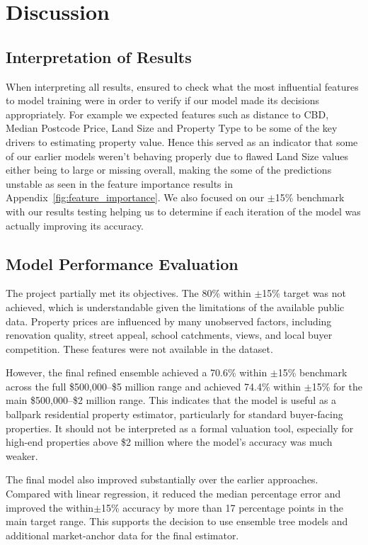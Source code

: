 \documentclass[a4paper,12pt]{article}
\begin{document}
\section{Discussion}

\subsection{Interpretation of Results}
When interpreting all results, ensured to check what the most influential features to model training were in order to verify if our model made its decisions appropriately. For example we expected features such as distance to CBD, Median Postcode Price, Land Size and Property Type to be some of the key drivers to estimating property value. Hence this served as an indicator that some of our earlier
models weren't behaving properly due to flawed Land Size values either being to large or missing overall, making the some of the predictions unstable as seen in the feature importance results in Appendix~\ref{fig:feature_importance}. We also focused on our $\pm$15\% benchmark with our results testing helping us to determine if each iteration of the model was actually improving its accuracy.

\subsection{Model Performance Evaluation}

The project partially met its objectives. The 80\% within $\pm$15\% target was not achieved, which is understandable given the limitations of the available public data. Property prices are influenced by many unobserved factors, including renovation quality, street appeal, school catchments, views, and local buyer competition. These features were not available in the dataset.

However, the final refined ensemble achieved a 70.6\% within $\pm$15\% benchmark across the full \$500,000--\$5 million range and achieved 74.4\% within $\pm$15\% for the main \$500,000--\$2 million range. This indicates that the model is useful as a ballpark residential property estimator, particularly for standard buyer-facing properties. It should not be interpreted as a formal valuation tool, especially for high-end properties above \$2 million where the model's accuracy was much weaker.

The final model also improved substantially over the earlier approaches. Compared with linear regression, it reduced the median percentage error and improved the within$\pm$15\% accuracy by more than 17 percentage points in the main target range. This supports the decision to use ensemble tree models and additional market-anchor data for the final estimator.
\end{document}
